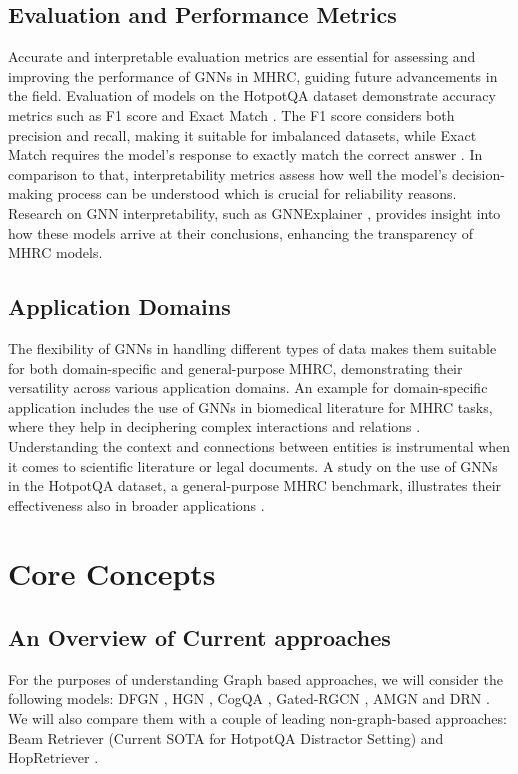 \documentclass[sigplan,screen]{acmart}
\begin{document}
\subsection{Evaluation and Performance Metrics}
Accurate and interpretable evaluation metrics are essential for assessing and improving the performance of GNNs in MHRC, guiding future advancements in the field.
Evaluation of models on the HotpotQA dataset demonstrate accuracy metrics such as F1 score and Exact Match \cite{RN116}. The F1 score considers both precision 
and recall, making it suitable for imbalanced datasets, while Exact Match requires the model's response to exactly match the correct answer \cite{RN116}.
In comparison to that, interpretability metrics assess how well the model's decision-making process can be understood which is crucial for reliability reasons.
Research on GNN interpretability, such as GNNExplainer \cite{RN213}, provides insight into how these models arrive at their conclusions, enhancing the transparency of MHRC models.

\subsection{Application Domains}
The flexibility of GNNs in handling different types of data makes them suitable for both domain-specific and general-purpose MHRC, 
demonstrating their versatility across various application domains. An example for domain-specific application includes the use of GNNs in biomedical literature for MHRC tasks, 
where they help in deciphering complex interactions and relations \cite{RN129}. Understanding the context and connections between entities is instrumental 
when it comes to scientific literature or legal documents. A study on the use of GNNs in the HotpotQA dataset, a general-purpose MHRC benchmark, 
illustrates their effectiveness also in broader applications \cite{RN116}.

\section{Core Concepts}
\subsection{An Overview of Current approaches}
For the purposes of understanding Graph based approaches, we will consider the following models:
DFGN \cite{RN122}, HGN \cite{RN119}, CogQA \cite{RN118}, Gated-RGCN \cite{RN91}, AMGN \cite{RN131} and DRN \cite{RN142}. We will also compare 
them with a couple of leading non-graph-based approaches: Beam Retriever \cite{RN105} (Current SOTA for HotpotQA Distractor Setting) and
HopRetriever \cite{RN149}.
\end{document}
